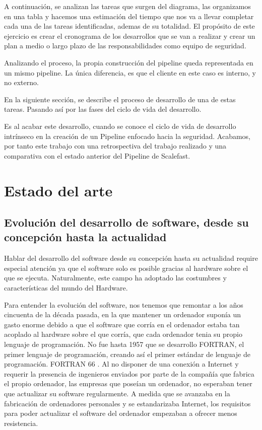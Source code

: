 \documentclass[12pt]{report} %
\begin{document}
A continuación, se analizan las tareas que surgen del diagrama, las organizamos
en una tabla y hacemos una estimación del tiempo que nos va a llevar completar
cada una de las tareas identificadas, ademas de su totalidad.
El propósito de este ejercicio es crear el cronograma de los desarrollos que se
van a realizar y crear un plan a medio o largo plazo de las responsabilidades
como equipo de seguridad.


Analizando el proceso, la propia construcción del pipeline queda representada 
en un mismo pipeline.
La única diferencia, es que el cliente en este caso es interno, y no externo.

En la siguiente sección, se describe el proceso de desarrollo de una de estas 
tareas.
Pasando así por las fases del ciclo de vida del desarrollo. 

Es al acabar este desarrollo, cuando se conoce el ciclo de vida de desarrollo
intrínseco en la creación de un Pipeline enfocado hacia la seguridad.
Acabamos, por tanto este trabajo con una retrospectiva del trabajo realizado y
una comparativa con el estado anterior del Pipeline de Scalefast.

\chapter{Estado del arte}

\section{Evolución del desarrollo de software, desde su concepción hasta la
actualidad}

Hablar del desarrollo del software desde su concepción hasta su actualidad
require especial atención ya que el software solo es posible gracias al hardware
sobre el que se ejecuta.  Naturalmente, este campo ha adoptado las costumbres y
características del mundo del Hardware.

Para entender la evolución del software, nos tenemos que remontar a los años
cincuenta de la década pasada, en la que mantener un ordenador suponía un gasto
enorme debido a que el software que corría en el ordenador estaba tan acoplado
al hardware sobre el que corría, que cada ordenador tenia su propio lenguaje de
programación.  No fue hasta 1957 que se desarrollo FORTRAN, el primer lenguaje
de programación, creando así el primer estándar de lenguaje de programación.
FORTRAN 66 \cite{FORTRAN1966}.  Al no disponer de una conexión a Internet y
requerir la presencia de ingenieros enviados por parte de la compañía que
fabrica el propio ordenador, las empresas que poseían un ordenador, no esperaban
tener que actualizar su software regularmente.  A medida que se avanzaba en la
fabricación de ordenadores personales y se estandarizaba Internet, los
requisitos para poder actualizar el software del ordenador empezaban a ofrecer
menos resistencia.
\end{document}

